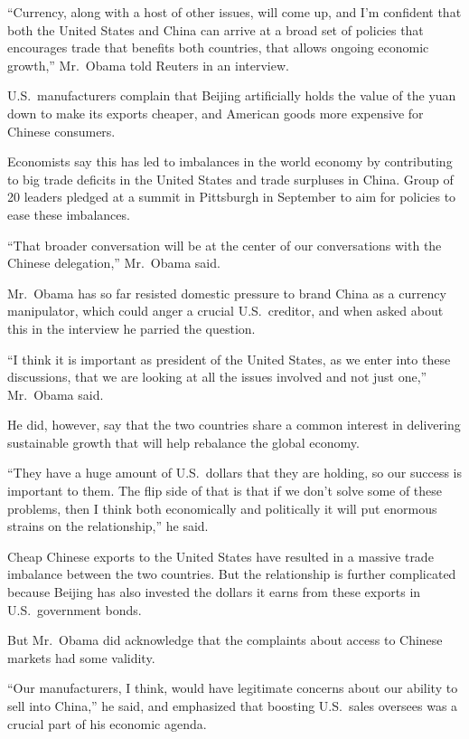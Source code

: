 ﻿\documentclass[12pt]{article}
\begin{document}
``Currency, along with a host of other issues, will come up, and I'm confident that both the United
States and China can arrive at a broad set of policies that encourages trade that benefits both
countries, that allows ongoing economic growth,'' Mr.~Obama told Reuters in an interview.

U.S.~manufacturers complain that Beijing artificially holds the value of the yuan down to make its
exports cheaper, and American goods more expensive for Chinese consumers.

Economists say this has led to imbalances in the world economy by contributing to big trade deficits
in the United States and trade surpluses in China. Group of 20 leaders pledged at a summit in
Pittsburgh in September to aim for policies to ease these imbalances.

``That broader conversation will be at the center of our conversations with the Chinese
delegation,'' Mr.~Obama said.

Mr.~Obama has so far resisted domestic pressure to brand China as a currency manipulator, which
could anger a crucial U.S.~creditor, and when asked about this in the interview he
parried\cite{parry} the question.

``I think it is important as president of the United States, as we enter into these discussions,
that we are looking at all the issues involved and not just one,'' Mr.~Obama said.

He did, however, say that the two countries share a common interest in delivering sustainable growth
that will help rebalance the global economy.

``They have a huge amount of U.S.~dollars that they are holding, so our success is important to
them. The flip side of that is that if we don't solve some of these problems, then I think both
economically and politically it will put enormous strains on the relationship,'' he said.

Cheap Chinese exports to the United States have resulted in a massive trade imbalance between the
two countries. But the relationship is further complicated because Beijing has also invested the
dollars it earns from these exports in U.S.~government bonds.

But Mr.~Obama did acknowledge that the complaints about access to Chinese markets had some validity.

``Our manufacturers, I think, would have legitimate concerns about our ability to sell into China,''
he said, and emphasized that boosting U.S.~sales oversees was a crucial part of his economic agenda.
\end{document}
